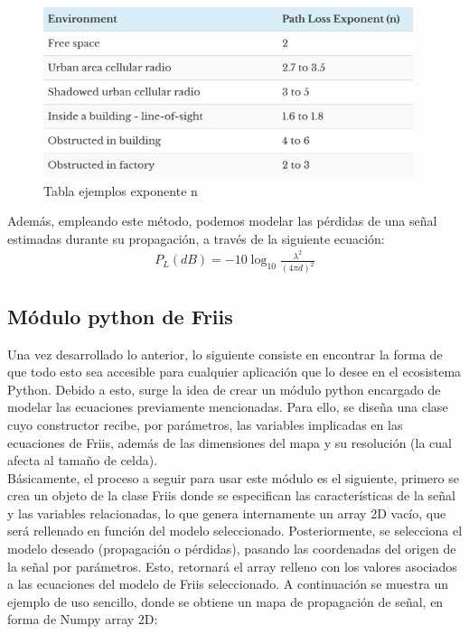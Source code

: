 \begin{figure} [H]
	\begin{center}
	\includegraphics[height=5cm]{imagenes/cap4/4_PLE_table.png}
	\end{center}
	\caption[Tabla ejemplos exponente n]{Tabla ejemplos exponente n}
	\label{fig:ple_table}
\end{figure}

Además, empleando este método, podemos modelar las pérdidas de una señal estimadas durante su propagación, a través de la siguiente ecuación:\\

\begin{align}
    P_L(dB) = -10 \log_{10} \frac{\lambda^2}{(4 \pi d)^2}
\end{align}

\subsection{Módulo python de Friis}
\label{subsec:friis-module}

Una vez desarrollado lo anterior, lo siguiente consiste en encontrar la forma de que todo esto sea accesible para cualquier aplicación que lo desee en el ecosistema Python. Debido a esto, surge la idea de crear un módulo python encargado de modelar las ecuaciones previamente mencionadas. Para ello, se diseña una clase cuyo constructor recibe, por parámetros, las variables implicadas en las ecuaciones de Friis, además de las dimensiones del mapa y su resolución (la cual afecta al tamaño de celda).\\

Básicamente, el proceso a seguir para usar este módulo es el siguiente, primero se crea un objeto de la clase Friis donde se especifican las características de la señal y las variables relacionadas, lo que genera internamente un array 2D vacío, que será rellenado en función del modelo seleccionado. Posteriormente, se selecciona el modelo deseado (propagación o pérdidas), pasando las coordenadas del origen de la señal por parámetros. Esto, retornará el array relleno con los valores asociados a las ecuaciones del modelo de Friis seleccionado. A continuación se muestra un ejemplo de uso sencillo, donde se obtiene un mapa de propagación de señal, en forma de Numpy array 2D:

